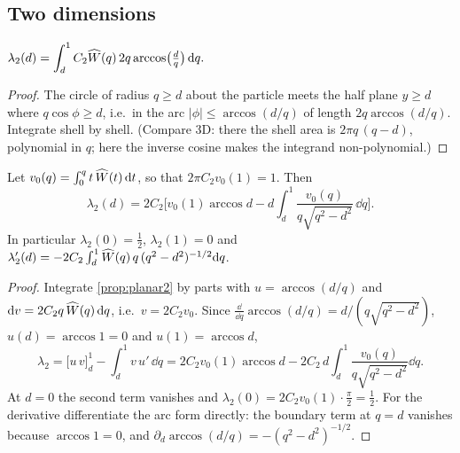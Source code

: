 \subsection{Two dimensions}\label{sec:planar2}
\begin{proposition}\label{prop:planar2}
$\displaystyle\lambda_2(d)=\int_d^1 C_2\widehat W(q)\,2q\arccos\!\big(\tfrac dq\big)\,\mathrm{d} q.$ 
\end{proposition}
\begin{proof}
The circle of radius $q\ge d$ about the particle meets the half plane $y\ge d$ where $q\cos\phi\ge d$, i.e.\ in the arc
$|\phi|\le\arccos(d/q)$ of length $2q\arccos(d/q)$. Integrate shell by shell. (Compare 3D: there the shell area is
$2\pi q\,(q-d)$, polynomial in $q$; here the inverse cosine makes the integrand non-polynomial.)
\end{proof}

\begin{proposition}\label{prop:byparts}
Let $v_0(q)=\int_0^q t\,\widehat W(t)\,\mathrm{d} t$, so that $2\pi C_2v_0(1)=1$. Then
\begin{equation}\label{eq:lam2-byparts}
 \lambda_2(d)=2C_2\Big[v_0(1)\arccos d-d\int_d^1\frac{v_0(q)}{q\sqrt{q^2-d^2}}\,\dd q\Big].
\end{equation}
In particular $\lambda_2(0)=\frac12$, $\lambda_2(1)=0$ and
$\lambda_2'(d)=-2C_2\int_d^1 \widehat W(q)\,q\,(q^2-d^2)^{-1/2}\mathrm{d} q$. 
\end{proposition}
\begin{proof}
Integrate \cref{prop:planar2} by parts with $u=\arccos(d/q)$ and $\mathrm{d} v=2C_2q\,\widehat W(q)\,\mathrm{d} q$, i.e.\ $v=2C_2v_0$.
Since $\frac{\dd}{\dd q}\arccos(d/q)=d/(q\sqrt{q^2-d^2})$, $u(d)=\arccos1=0$ and $u(1)=\arccos d$,
\[
 \lambda_2=\big[u\,v\big]_d^1-\int_d^1v\,u'\,\dd q
 =2C_2v_0(1)\arccos d-2C_2\,d\int_d^1\frac{v_0(q)}{q\sqrt{q^2-d^2}}\dd q .
\]
At $d=0$ the second term vanishes and $\lambda_2(0)=2C_2v_0(1)\cdot\frac\pi2=\frac12$. For the derivative
differentiate the arc form directly: the boundary term at $q=d$ vanishes because $\arccos1=0$, and
$\partial_d\arccos(d/q)=-(q^2-d^2)^{-1/2}$.
\end{proof}

